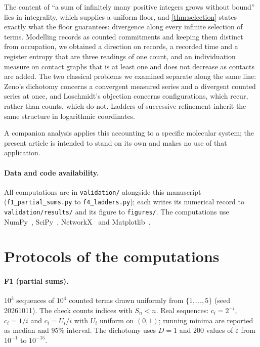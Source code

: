 \documentclass[10pt,twocolumn,a4paper]{article}
\begin{document}
The content of ``a sum of infinitely many positive integers grows without
bound'' lies in integrality, which supplies a uniform floor, and
\cref{thm:selection} states exactly what the floor guarantees: divergence
along every infinite selection of terms. Modelling records as counted
commitments and keeping them distinct from occupation, we obtained a direction
on records, a recorded time and a register entropy that are three readings of
one count, and an individuation measure on contact graphs that is at least
one and does not decrease as contacts are added. The two classical problems
we examined separate along the same line: Zeno's dichotomy concerns a
convergent measured series and a divergent counted series at once, and
Loschmidt's objection concerns configurations, which recur, rather than
counts, which do not. Ladders of successive refinement inherit the same
structure in logarithmic coordinates.

A companion analysis applies this accounting to a specific molecular system;
the present article is intended to stand on its own and makes no use of
that application.

\paragraph{Data and code availability.}
All computations are in \texttt{validation/} alongside this manuscript
(\texttt{f1\_partial\_sums.py} to \texttt{f4\_ladders.py}); each writes its
numerical record to \texttt{validation/results/} and its figure to
\texttt{figures/}. The computations use NumPy~\citep{harris2020},
SciPy~\citep{virtanen2020}, NetworkX~\citep{hagberg2008} and
Matplotlib~\citep{hunter2007}.

\appendix
\section{Protocols of the computations}
\label{app:protocols}

\paragraph{F1 (partial sums).} $10^3$ sequences of $10^4$ counted terms
drawn uniformly from $\{1,\dots,5\}$ (seed 20261011). The check counts indices
with $S_n<n$. Real sequences: $c_i=2^{-i}$, $c_i=1/i$ and $c_i=U_i/i$ with
$U_i$ uniform on $(0,1)$; running minima are reported as median and 95\%
interval. The dichotomy uses $D=1$ and $200$ values of $\varepsilon$ from
$10^{-1}$ to $10^{-15}$.
\end{document}
